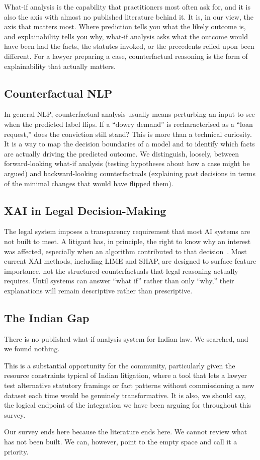 What-if analysis is the capability that practitioners most often ask for, and it is also the axis with almost no published literature behind it. It is, in our view, the axis that matters most. Where prediction tells you what the likely outcome is, and explainability tells you why, what-if analysis asks what the outcome would have been had the facts, the statutes invoked, or the precedents relied upon been different. For a lawyer preparing a case, counterfactual reasoning is the form of explainability that actually matters.

\subsection{Counterfactual NLP}

In general NLP, counterfactual analysis usually means perturbing an input to see when the predicted label flips. If a ``dowry demand'' is recharacterised as a ``loan request,'' does the conviction still stand? This is more than a technical curiosity. It is a way to map the decision boundaries of a model and to identify which facts are actually driving the predicted outcome. We distinguish, loosely, between forward-looking what-if analysis (testing hypotheses about how a case might be argued) and backward-looking counterfactuals (explaining past decisions in terms of the minimal changes that would have flipped them).

\subsection{XAI in Legal Decision-Making}

The legal system imposes a transparency requirement that most AI systems are not built to meet. A litigant has, in principle, the right to know why an interest was affected, especially when an algorithm contributed to that decision~\cite{deakin-etal-2023-xai-law}. Most current XAI methods, including LIME and SHAP, are designed to surface feature importance, not the structured counterfactuals that legal reasoning actually requires. Until systems can answer ``what if'' rather than only ``why,'' their explanations will remain descriptive rather than prescriptive.

\subsection{The Indian Gap}

There is no published what-if analysis system for Indian law. We searched, and we found nothing.

This is a substantial opportunity for the community, particularly given the resource constraints typical of Indian litigation, where a tool that lets a lawyer test alternative statutory framings or fact patterns without commissioning a new dataset each time would be genuinely transformative. It is also, we should say, the logical endpoint of the integration we have been arguing for throughout this survey.

Our survey ends here because the literature ends here. We cannot review what has not been built. We can, however, point to the empty space and call it a priority.
